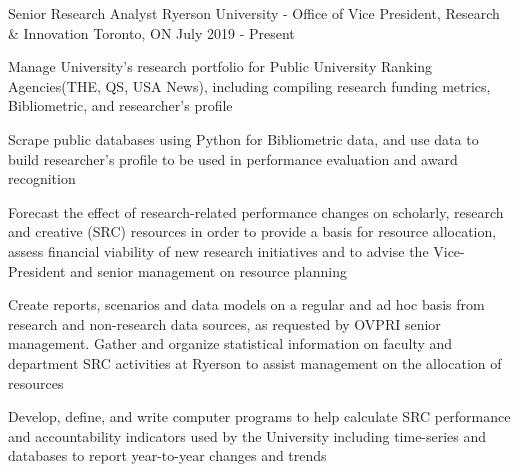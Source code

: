

\begin{cventries}

  \cventry
    {Senior Research Analyst} %
    {Ryerson University - Office of Vice President, Research \& Innovation } %
    {Toronto, ON} %
    {July 2019 - Present} %
    {
      \begin{cvitems} %
        \item {Manage University’s research portfolio for Public University Ranking Agencies(THE, QS, USA News), including compiling research funding metrics, Bibliometric, and researcher’s profile}
        \item {Scrape public databases using Python for Bibliometric data, and use data to build researcher’s profile to be used in performance evaluation and award recognition}
        \item {Forecast the effect of research-related performance changes on scholarly, research and creative (SRC) resources in order to provide a basis for resource allocation, assess financial viability of new research initiatives and to advise the Vice-President and senior management on resource planning}
        \item{Create reports, scenarios and data models on a regular and ad hoc basis from research and non-research data sources, as requested by OVPRI senior management.  Gather and organize statistical information on faculty and department SRC activities at Ryerson to assist management on the allocation of resources}
        \item {Develop, define, and write computer programs to help calculate SRC performance and accountability indicators used by the University including time-series and databases to report year-to-year changes and trends}
        {}
      \end{cvitems}
    }

 

\end{cventries}
